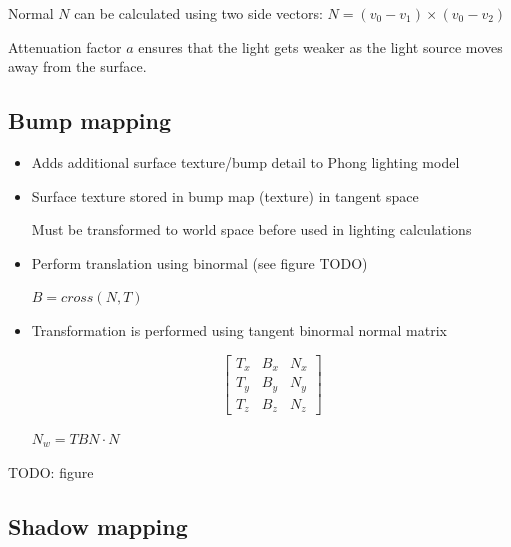 \documentclass[a4paper]{article}
\begin{document}
Normal $N$ can be calculated using two side vectors: $N = (v_{0} - v_{1}) \times
(v_{0} - v_{2})$

Attenuation factor $a$ ensures that the light gets weaker as the light source
moves away from the surface.

\subsection{Bump mapping}

\begin{itemize}
  \item
    Adds additional surface texture/bump detail to Phong lighting model

  \item
    Surface texture stored in bump map (texture) in tangent space

    Must be transformed to world space before used in lighting calculations

  \item
    Perform translation using binormal (see figure TODO)

    $B = cross(N, T)$

  \item
    Transformation is performed using tangent binormal normal matrix

    \[
      \left [
        \begin{array}{ccc}
          T_{x} & B_{x} & N_{x} \\
          T_{y} & B_{y} & N_{y} \\
          T_{z} & B_{z} & N_{z}
        \end{array}
      \right ]
    \]

    $N_{w} = TBN \cdot N$

\end{itemize}

TODO: figure

\subsection{Shadow mapping}
\end{document}
